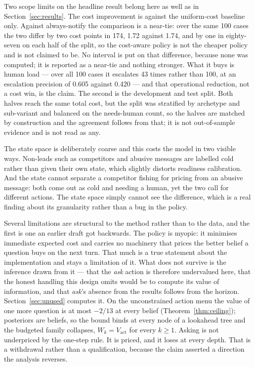 \documentclass{article}
\begin{document}
Two scope limits on the headline result belong here as well as in
Section~\ref{sec:results}. The cost improvement is against the uniform-cost
baseline only. Against always-notify the comparison is a near-tie: over the same
100 cases the two differ by two cost points in 174, 1.72 against 1.74, and by one
in eighty-seven on each half of the split, so the cost-aware policy is not the
cheaper policy and is not claimed to be. No interval is put on that difference,
because none was computed; it is reported as a near-tie and nothing stronger. What
it buys is human load --- over all 100 cases it escalates 43 times rather than
100, at an escalation
precision of 0.605 against 0.420 --- and that operational reduction, not a cost
win, is the claim. The second is the development and test split. Both halves reach
the same total cost, but the split was stratified by archetype and sub-variant and
balanced on the needs-human count, so the halves are matched by construction and
the agreement follows from that; it is not out-of-sample evidence and is not read
as any.

The state space is deliberately coarse and this costs the model in two visible
ways. Non-leads such as competitors and abusive messages are labelled cold rather
than given their own state, which slightly distorts readiness calibration. And the
state cannot separate a competitor fishing for pricing from an abusive message:
both come out as cold and needing a human, yet the two call for different actions.
The state space simply cannot see the difference, which is a real finding about
its granularity rather than a bug in the policy.

Several limitations are structural to the method rather than to the data, and the
first is one an earlier draft got backwards. The policy is myopic: it minimises
immediate expected cost and carries no machinery that prices the better belief a
question buys on the next turn. That much is a true statement about the
implementation and stays a limitation of it. What does not survive is the
inference drawn from it --- that the \emph{ask} action is therefore undervalued
here, that the honest handling this design omits would be to compute its value of
information, and that \emph{ask}'s absence from the results follows from the
horizon. Section~\ref{sec:unused} computes it. On the unconstrained action menu
the value of one more question is at most $-2/13$ at every belief
(Theorem~\ref{thm:ceiling}); posteriors are beliefs, so the bound binds at every
node of a lookahead tree and the budgeted family collapses, $W_k =
V_{\mathrm{act}}$ for every $k \ge 1$. Asking is not underpriced by the one-step
rule. It is priced, and it loses at every depth. That is a withdrawal rather than
a qualification, because the claim asserted a direction the analysis reverses.
\end{document}

